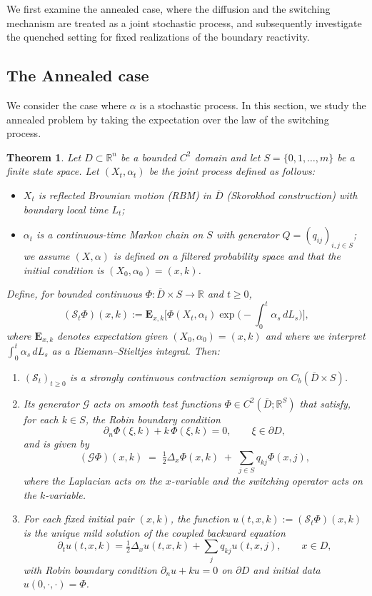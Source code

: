 \documentclass[11pt]{amsart}
\theoremstyle{plain}
\newtheorem{theorem}{Theorem}[section]
\theoremstyle{definition}
\theoremstyle{remark}
\begin{document}
We first examine the annealed case, where the diffusion and the switching mechanism are treated as a joint stochastic process, and subsequently investigate the quenched setting for fixed realizations of the boundary reactivity.

\subsection{The Annealed case}
We consider the case where $\alpha$ is a stochastic process. In this section, we study the annealed problem by taking the expectation over the law of the switching process.
\begin{theorem}
	\label{thm:annealed}
	Let $D\subset\mathbb R^n$ be a bounded $C^2$ domain and let $S=\{0,1,\dots,m\}$ be a finite state space. Let $(X_t,\alpha_t)$ be the joint process defined as follows:
	\begin{itemize}
		\item $X_t$ is reflected Brownian motion (RBM) in $\overline D$ (Skorokhod construction) with boundary local time $L_t$;
		\item $\alpha_t$ is a continuous-time Markov chain on $S$ with generator $Q=(q_{ij})_{i,j\in S}$; we assume $(X,\alpha)$ is defined on a filtered probability space and that the initial condition is $(X_0,\alpha_0)=(x,k)$.
	\end{itemize}
	Define, for bounded continuous $\Phi:\overline D\times S\to\mathbb R$ and $t\ge0$,
	\[
	(\mathcal S_t\Phi)(x,k) := \mathbf{E}_{x,k}\Big[ \Phi(X_t,\alpha_t)\exp\Big(-\int_0^t \alpha_s\,dL_s\Big)\Big],
	\]
	where $\mathbf E_{x,k}$ denotes expectation given $(X_0,\alpha_0)=(x,k)$ and where we interpret $\int_0^t\alpha_s\,dL_s$ as a Riemann–Stieltjes integral. Then:
	\begin{enumerate}
		\item $(\mathcal S_t)_{t\ge0}$ is a strongly continuous contraction semigroup on $C_b(\overline D\times S)$.
		\item Its generator $\mathcal G$ acts on smooth test functions $\Phi\in C^2(\overline D; \mathbb R^S)$ that satisfy, for each $k\in S$, the Robin boundary condition
		\[
		\partial_n \Phi(\xi,k) + k\,\Phi(\xi,k)=0,\qquad \xi\in\partial D,
		\]
		and is given by
		\[
		(\mathcal G\Phi)(x,k) \;=\; \tfrac12\Delta_x \Phi(x,k) \;+\; \sum_{j\in S} q_{kj}\Phi(x,j),
		\]
		where the Laplacian acts on the \(x\)-variable and the switching operator acts on the \(k\)-variable.
		\item For each fixed initial pair $(x,k)$, the function $u(t,x,k):=(\mathcal S_t\Phi)(x,k)$ is the unique mild solution of the coupled backward equation
		\[
		\partial_t u(t,x,k) = \tfrac12\Delta_x u(t,x,k) + \sum_{j} q_{kj} u(t,x,j),\qquad x\in D,
		\]
		with Robin boundary condition $\partial_n u + k u =0$ on $\partial D$ and initial data $u(0,\cdot,\cdot)=\Phi$.
	\end{enumerate}
\end{theorem}
\end{document}
